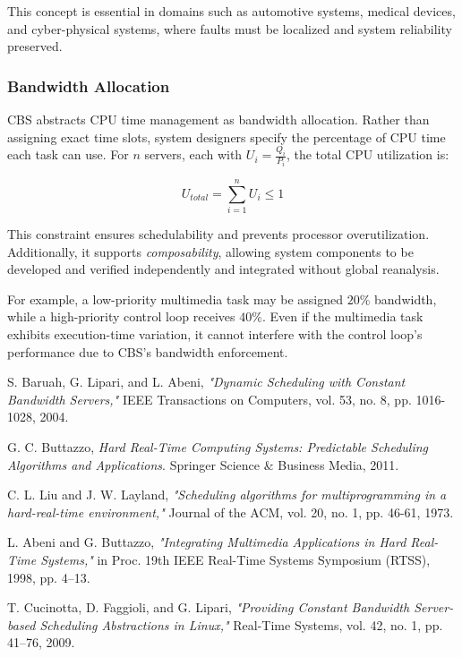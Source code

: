 \documentclass[conference]{IEEEtran}
\begin{document}
This concept is essential in domains such as automotive systems, medical devices, and cyber-physical systems, where faults must be localized and system reliability preserved.

\subsubsection{Bandwidth Allocation}

CBS abstracts CPU time management as bandwidth allocation. Rather than assigning exact time slots, system designers specify the percentage of CPU time each task can use. For \( n \) servers, each with \( U_i = \frac{Q_i}{P_i} \), the total CPU utilization is:

\[
U_{total} = \sum_{i=1}^{n} U_i \leq 1
\]

This constraint ensures schedulability and prevents processor overutilization. Additionally, it supports \textit{composability}, allowing system components to be developed and verified independently and integrated without global reanalysis.

For example, a low-priority multimedia task may be assigned \( 20\% \) bandwidth, while a high-priority control loop receives \( 40\% \). Even if the multimedia task exhibits execution-time variation, it cannot interfere with the control loop’s performance due to CBS’s bandwidth enforcement.



\begin{thebibliography}{9}

S. Baruah, G. Lipari, and L. Abeni, \textit{"Dynamic Scheduling with Constant Bandwidth Servers,"} IEEE Transactions on Computers, vol. 53, no. 8, pp. 1016-1028, 2004.

G. C. Buttazzo, \textit{Hard Real-Time Computing Systems: Predictable Scheduling Algorithms and Applications}. Springer Science \& Business Media, 2011.

C. L. Liu and J. W. Layland, \textit{"Scheduling algorithms for multiprogramming in a hard-real-time environment,"} Journal of the ACM, vol. 20, no. 1, pp. 46-61, 1973.

L. Abeni and G. Buttazzo, \textit{"Integrating Multimedia Applications in Hard Real-Time Systems,"} in Proc. 19th IEEE Real-Time Systems Symposium (RTSS), 1998, pp. 4–13.

T. Cucinotta, D. Faggioli, and G. Lipari, \textit{"Providing Constant Bandwidth Server-based Scheduling Abstractions in Linux,"} Real-Time Systems, vol. 42, no. 1, pp. 41–76, 2009.


\end{thebibliography}
\end{document}
